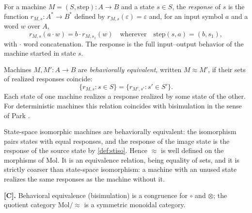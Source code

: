 \begin{definition}[Response]\label{def:response}
For a machine $M = (S, \mathrm{step}) : A \to B$ and a state $s \in S$, the
\emph{response} of $s$ is the function $r_{M,s} : A^{*} \to B^{*}$ defined by
$r_{M,s} (\varepsilon) = \varepsilon$ and, for an input symbol $a$ and a word
$w$ over $A$,
\[ r_{M,s} (a \cdot w) = b \cdot r_{M,s_1} (w)
   \quad\text{wherever}\quad \mathrm{step} (s, a) = (b, s_1) , \]
with $\cdot$ word concatenation. The response is the full input--output
behavior of the machine started in state $s$.
\end{definition}

\begin{definition}\label{def:bisim}
Machines $M, M' : A \to B$ are \emph{behaviorally equivalent}, written
$M \approx M'$, if their sets of realized responses coincide:
\[ \{ r_{M,s} : s \in S \} = \{ r_{M',s'} : s' \in S' \} . \]
Each state of one machine realizes a response realized by some state of the
other. For deterministic machines this relation coincides with bisimulation
in the sense of Park \citep{park}.
\end{definition}

\begin{remark}
State-space isomorphic machines are behaviorally equivalent: the isomorphism
pairs states with equal responses, and the response of the image state is
the response of the source state by \autoref{def:stiso}. Hence $\approx$ is
well defined on the morphisms of Mol. It is an equivalence relation, being
equality of sets, and it is strictly coarser than state-space isomorphism: a
machine with an unused state realizes the same responses as the machine
without it.
\end{remark}

\begin{theorem}\label{thm:6}
\textbf{[C].} Behavioral equivalence (bisimulation) is a congruence for
$\circ$ and $\otimes$; the quotient category $\mathrm{Mol}/{\approx}$ is a
symmetric monoidal category.
\end{theorem}


